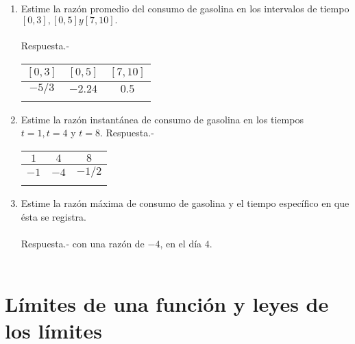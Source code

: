 \begin{enumerate}
\begin{enumerate}[\bfseries a)]
    \item Estime la razón promedio del consumo de gasolina en los intervalos de tiempo $[0, 3], [0, 5] y [7, 10].$\\\\
	Respuesta.-\; 
	\begin{center}
	    \begin{tabular}{c|c|c}
	     $[0,3]$&$[0,5]$&$[7,10]$\\
	     \hline
	     $-5/3$&$-2.24$&$0.5$\\\\
	    \end{tabular}
	\end{center}

    \item Estime la razón instantánea de consumo de gasolina en los tiempos $t = 1, t = 4$ y $t = 8$.
	Respuesta.-\; 
	\begin{center}
	    \begin{tabular}{c|c|c}
	     $1$&$4$&$8$\\
	     \hline
	     $-1$&$-4$&$-1/2$\\\\
	    \end{tabular}
	\end{center}

    \item Estime la razón máxima de consumo de gasolina y el tiempo específico en que ésta se registra.\\\\
	Respuesta.-\; con una razón de $-4$, en el día $4$.\\\\ 

\end{enumerate}
\end{enumerate}


\section{Límites de una función y leyes de los límites}

